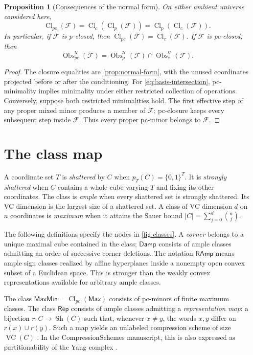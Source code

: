 \documentclass[11pt]{article}
\newtheorem{proposition}{Proposition}[section]
\theoremstyle{definition}
\newcommand{\bits}{\{0,1\}}
\newcommand{\Max}{\mathsf{Max}}
\newcommand{\MaxMin}{\mathsf{MaxMin}}
\newcommand{\Damp}{\mathsf{Damp}}
\newcommand{\RAmp}{\mathsf{RAmp}}
\newcommand{\Rep}{\mathsf{Rep}}
\newcommand{\Sh}{\operatorname{Sh}}
\newcommand{\VC}{\operatorname{VC}}
\newcommand{\Obs}{\operatorname{Obs}}
\newcommand{\Cl}{\operatorname{Cl}}
\begin{document}
\begin{proposition}[Consequences of the normal form]\label{prop:operators}
On either ambient universe considered here,
\[
 \Cl_{pc}(\mathcal F)=\Cl_c(\Cl_p(\mathcal F))
                    =\Cl_p(\Cl_c(\mathcal F)).
\]
In particular, if $\mathcal F$ is p-closed, then
$\Cl_{pc}(\mathcal F)=\Cl_c(\mathcal F)$.
If $\mathcal F$ is pc-closed, then
\begin{equation}\label{eq:basis-intersection}
 \Obs_{pc}^{\mathcal U}(\mathcal F)
 =\Obs_p^{\mathcal U}(\mathcal F)\cap\Obs_c^{\mathcal U}(\mathcal F).
\end{equation}
\end{proposition}
\begin{proof}
The closure equalities are \cref{prop:normal-form}, with the unused coordinates
projected before or after the conditioning. For \eqref{eq:basis-intersection},
pc-minimality implies minimality under either restricted collection of
operations. Conversely, suppose both restricted minimalities hold. The first
effective step of any proper mixed minor produces a member of $\mathcal F$;
pc-closure keeps every subsequent step inside $\mathcal F$. Thus every proper
pc-minor belongs to $\mathcal F$.
\end{proof}

\section{The class map}\label{sec:map}

A coordinate set $T$ is \emph{shattered} by $C$ when $p_T(C)=\bits^T$.
It is \emph{strongly shattered} when $C$ contains a whole cube varying $T$
and fixing its other coordinates. The class is \emph{ample} when every
shattered set is strongly shattered. Its VC dimension is the largest size
of a shattered set. A class of VC dimension $d$ on $n$ coordinates is
\emph{maximum} when it attains the Sauer bound
$|C|=\sum_{j=0}^{d}\binom nj$.

The following definitions specify the nodes in \cref{fig:classes}.
A \emph{corner} belongs to a unique maximal cube contained in the class;
$\Damp$ consists of ample classes admitting an order of successive corner
deletions. The notation $\RAmp$ means ample sign classes realized by affine
hyperplanes inside a nonempty open convex subset of a Euclidean space.
This is stronger than the weakly convex representations available for
arbitrary ample classes.

The class $\MaxMin=\Cl_{pc}(\Max)$ consists of pc-minors of finite maximum
classes. The class $\Rep$ consists of ample classes admitting a
\emph{representation map}: a bijection $r:C\to\Sh(C)$ such that, whenever
$x\ne y$, the words $x,y$ differ on $r(x)\cup r(y)$. Such a map yields
an unlabeled compression scheme of size $\VC(C)$ \cite{CCMW}. In the
CompressionSchemes manuscript, this is also expressed as partitionability
of the Yang complex \cite{Partition}.
\end{document}
